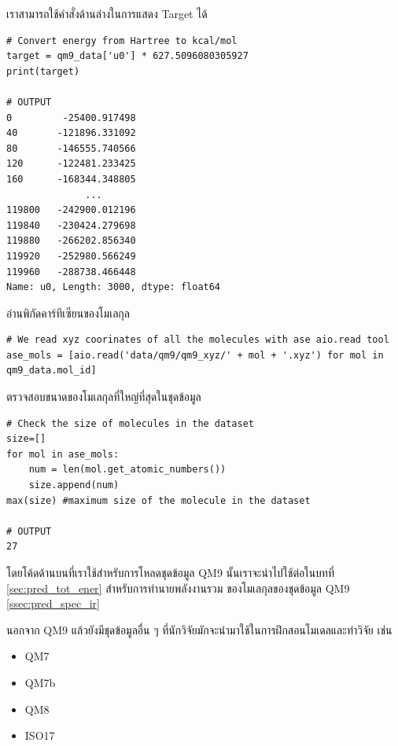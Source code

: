 \noindent เราสามารถใช้คำสั่งด้านล่างในการแสดง Target ได้

\begin{lstlisting}[style=MyPython]
# Convert energy from Hartree to kcal/mol
target = qm9_data['u0'] * 627.5096080305927 
print(target)

# OUTPUT
0         -25400.917498
40       -121896.331092
80       -146555.740566
120      -122481.233425
160      -168344.348805
              ...      
119800   -242900.012196
119840   -230424.279698
119880   -266202.856340
119920   -252980.566249
119960   -288738.466448
Name: u0, Length: 3000, dtype: float64
\end{lstlisting}

\noindent อ่านพิกัดคาร์ทีเซียนของโมเลกุล

\begin{lstlisting}[style=MyPython]
# We read xyz coorinates of all the molecules with ase aio.read tool
ase_mols = [aio.read('data/qm9/qm9_xyz/' + mol + '.xyz') for mol in qm9_data.mol_id]
\end{lstlisting}

\noindent ตรวจสอบขนาดของโมเลกุลที่ใหญ่ที่สุดในชุดข้อมูล

\begin{lstlisting}[style=MyPython]
# Check the size of molecules in the dataset
size=[]
for mol in ase_mols:
    num = len(mol.get_atomic_numbers())
    size.append(num)
max(size) #maximum size of the molecule in the dataset

# OUTPUT
27
\end{lstlisting}

โดยโค้ดด้านบนที่เราใช้สำหรับการโหลดชุดข้อมูล QM9 นั้นเราจะนำไปใช้ต่อในบทที่ \ref{sec:pred_tot_ener} สำหรับการทำนายพลังงานรวม%
ของโมเลกุลของชุดข้อมูล QM9 \ref{ssec:pred_spec_ir}

นอกจาก QM9 แล้วยังมีชุดข้อมูลอื่น ๆ ที่นักวิจัยมักจะนำมาใช้ในการฝึกสอนโมเดลและทำวิจัย เช่น 

\begin{itemize}
    \item QM7\autocite{blum2009,rupp2012a}
    
    \item QM7b\autocite{blum2009,montavon2013}
    
    \item QM8\autocite{ruddigkeit2012,ramakrishnan2015}
    
    \item ISO17\autocite{schutt2017,schutt2017a,ramakrishnan2014}
\end{itemize}

